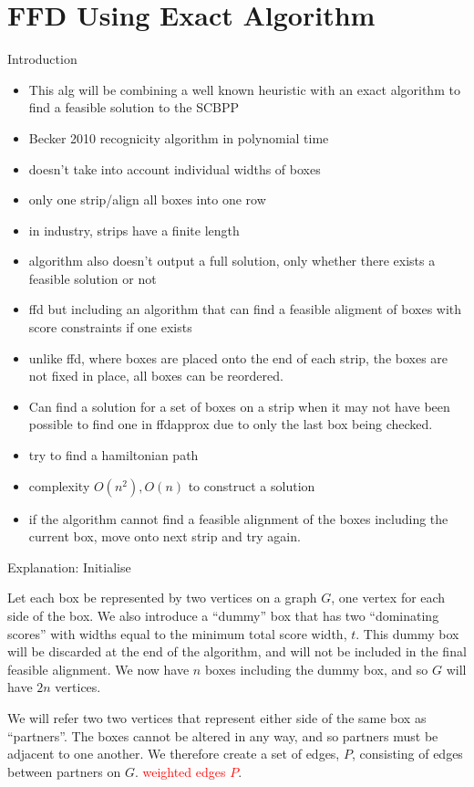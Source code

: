 \documentclass[oribibl]{llncs}
\begin{document}
\section{FFD Using Exact Algorithm}
\label{sec:ffdexact}
Introduction
\begin{itemize}
	\item This alg will be combining a well known heuristic with an exact algorithm to find a feasible solution to the SCBPP
	\item Becker 2010 recognicity algorithm in polynomial time
	\item doesn't take into account individual widths of boxes
	\item only one strip/align all boxes into one row
	\item in industry, strips have a finite length
	\item algorithm also doesn't output a full solution, only whether there exists a feasible solution or not
	\item ffd but including an algorithm that can find a feasible aligment of boxes with score constraints if one exists
	\item unlike ffd, where boxes are placed onto the end of each strip, the boxes are not fixed in place, all boxes can be reordered.
	\item Can find a solution for a set of boxes on a strip when it may not have been possible to find one in ffdapprox due to only the last box being checked.
	\item try to find a hamiltonian path 
	\item complexity $O(n^2), O(n)$ to construct a solution
	\item if the algorithm cannot find a feasible alignment of the boxes including the current box, move onto next strip and try again.
\end{itemize}

Explanation: Initialise

Let each box be represented by two vertices on a graph $G$, one vertex for each side of the box. We also introduce a ``dummy'' box that has two ``dominating scores'' with widths equal to the minimum total score width, $t$. This dummy box will be discarded at the end of the algorithm, and will not be included in the final feasible alignment. We now have $n$ boxes including the dummy box, and so $G$ will have $2n$ vertices.

We will refer two two vertices that represent either side of the same box as ``partners''. The boxes cannot be altered in any way, and so partners must be adjacent to one another. We therefore create a set of edges, $P$, consisting of edges between partners on $G$. \textcolor{red}{weighted edges $P$}.
\end{document}
